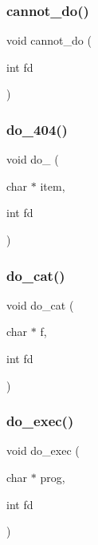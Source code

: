 \subsubsection{\texorpdfstring{cannot\_do()}{cannot\_do()}}
{\footnotesize\ttfamily void cannot\+\_\+do (\begin{DoxyParamCaption}\item[{int}]{fd }\end{DoxyParamCaption})}

\mbox{\label{10a-serwer_8c_ad3f91122750391e238cfbee3b88975ec}} 
\subsubsection{\texorpdfstring{do\_404()}{do\_404()}}
{\footnotesize\ttfamily void do\+\_ (\begin{DoxyParamCaption}\item[{char $\ast$}]{item,  }\item[{int}]{fd }\end{DoxyParamCaption})}

\mbox{\label{10a-serwer_8c_adab7e9f2617cceb5752ef3f97cfc2ef1}} 
\subsubsection{\texorpdfstring{do\_cat()}{do\_cat()}}
{\footnotesize\ttfamily void do\+\_\+cat (\begin{DoxyParamCaption}\item[{char $\ast$}]{f,  }\item[{int}]{fd }\end{DoxyParamCaption})}

\mbox{\label{10a-serwer_8c_a0a305ff573da158eaa9484e5506921c0}} 
\subsubsection{\texorpdfstring{do\_exec()}{do\_exec()}}
{\footnotesize\ttfamily void do\+\_\+exec (\begin{DoxyParamCaption}\item[{char $\ast$}]{prog,  }\item[{int}]{fd }\end{DoxyParamCaption})}

